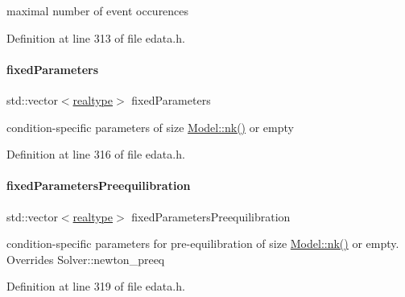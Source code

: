 maximal number of event occurences 

Definition at line 313 of file edata.\+h.

\mbox{\label{classamici_1_1_exp_data_ac1d5115134ec1c839f1e913724ceb2b4}} 
\paragraph{\texorpdfstring{fixed\+Parameters}{fixedParameters}}
{\footnotesize\ttfamily std\+::vector$<$\mbox{\hyperlink{namespaceamici_a1bdce28051d6a53868f7ccbf5f2c14a3}{realtype}}$>$ fixed\+Parameters}

condition-\/specific parameters of size \mbox{\hyperlink{classamici_1_1_model_a3d4130da64883565a06a86e7d6029da1}{Model\+::nk()}} or empty 

Definition at line 316 of file edata.\+h.

\mbox{\label{classamici_1_1_exp_data_acee836e015941b3984c44e1c7423b101}} 
\paragraph{\texorpdfstring{fixed\+Parameters\+Preequilibration}{fixedParametersPreequilibration}}
{\footnotesize\ttfamily std\+::vector$<$\mbox{\hyperlink{namespaceamici_a1bdce28051d6a53868f7ccbf5f2c14a3}{realtype}}$>$ fixed\+Parameters\+Preequilibration}

condition-\/specific parameters for pre-\/equilibration of size \mbox{\hyperlink{classamici_1_1_model_a3d4130da64883565a06a86e7d6029da1}{Model\+::nk()}} or empty. Overrides Solver\+::newton\+\_\+preeq 

Definition at line 319 of file edata.\+h.

\mbox{\label{classamici_1_1_exp_data_a86fb66aedc21085f868fb6509a45c92d}} 
